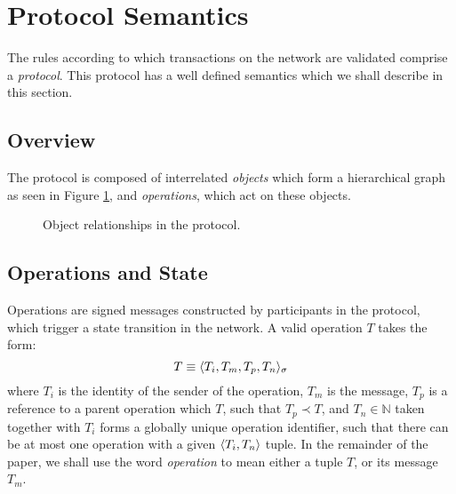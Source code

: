 \section{Protocol Semantics}


The rules according to which transactions on the \oscoin{} network are
validated comprise a \emph{protocol}. This protocol has a well defined semantics
which we shall describe in this section.

\subsection{Overview} The \oscoin{} protocol is composed of interrelated
\emph{objects} which form a hierarchical graph as seen in Figure
\ref{object-relationships}, and \emph{operations}, which act on these objects.

\medskip

\begin{figure}[htp]
\bigskip
\caption{Object relationships in the \oscoin{} protocol.
\label{object-relationships}}
\end{figure}

\subsection{Operations and State}

Operations are signed messages constructed by participants in the protocol,
which trigger a state transition in the network. A valid operation $T$ takes
the form:
\[
    T \equiv \langle T_i, T_m, T_p, T_n \rangle_{\sigma}
\]
where $T_i$ is the identity of the sender of the operation, $T_m$ is the
message, $T_p$ is a reference to a parent operation which $T$, such that $T_p
\prec T$, and $T_n \in \mathbb{N}$ taken together with $T_i$ forms a globally
unique operation identifier, such that there can be at most one operation with
a given $\langle T_i, T_n \rangle$ tuple. In the remainder of the paper, we shall
use the word \emph{operation} to mean either a tuple $T$, or its message $T_m$.

